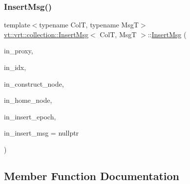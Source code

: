 \mbox{\label{structvt_1_1vrt_1_1collection_1_1_insert_msg_a2df48d0777f98f268beee283f1bbd840}} 
\subsubsection{\texorpdfstring{Insert\+Msg()}{InsertMsg()}\hspace{0.1cm}{\footnotesize\ttfamily [2/2]}}
{\footnotesize\ttfamily template$<$typename ColT, typename MsgT$>$ \\
\hyperlink{structvt_1_1vrt_1_1collection_1_1_insert_msg}{vt\+::vrt\+::collection\+::\+Insert\+Msg}$<$ ColT, MsgT $>$\+::\hyperlink{structvt_1_1vrt_1_1collection_1_1_insert_msg}{Insert\+Msg} (\begin{DoxyParamCaption}\item[{\hyperlink{structvt_1_1vrt_1_1collection_1_1_collection_proxy}{Collection\+Proxy}$<$ ColT $>$}]{in\+\_\+proxy,  }\item[{\hyperlink{structvt_1_1vrt_1_1collection_1_1_insert_msg_a6d0f0e849ba09859a0cda3e4785de16b}{Index\+Type}}]{in\+\_\+idx,  }\item[{\hyperlink{namespacevt_a866da9d0efc19c0a1ce79e9e492f47e2}{Node\+Type}}]{in\+\_\+construct\+\_\+node,  }\item[{\hyperlink{namespacevt_a866da9d0efc19c0a1ce79e9e492f47e2}{Node\+Type}}]{in\+\_\+home\+\_\+node,  }\item[{\hyperlink{namespacevt_a985a5adf291c34a3ca263b3378388236}{Epoch\+Type}}]{in\+\_\+insert\+\_\+epoch,  }\item[{\hyperlink{namespacevt_ab2b3d506ec8e8d1540aede826d84a239}{Msg\+Shared\+Ptr}$<$ MsgT $>$}]{in\+\_\+insert\+\_\+msg = {\ttfamily nullptr} }\end{DoxyParamCaption})\hspace{0.3cm}{\ttfamily [inline]}}



\subsection{Member Function Documentation}
\mbox{\label{structvt_1_1vrt_1_1collection_1_1_insert_msg_ac55e25383969b7d021b68e6062974a6d}} 
